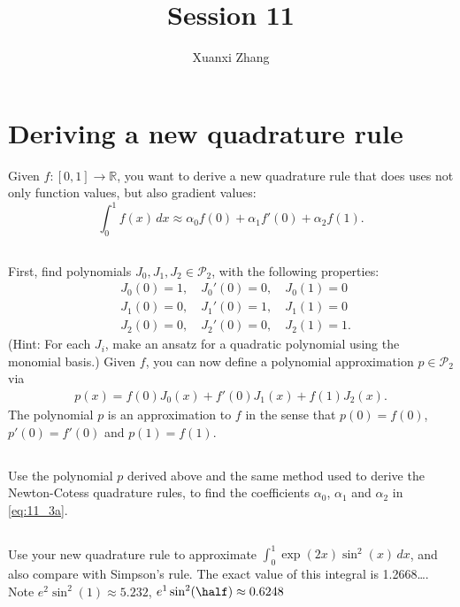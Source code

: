 \documentclass{article}%
\title{\huge Session 11\\
\normalsize}
\author{Xuanxi Zhang}
\begin{document}
\maketitle

\section{Deriving a new quadrature rule}
Given $f:[0,1]\rightarrow \mathbb{R}$, you want to derive a new
  quadrature rule that does uses not only function values, but also
  gradient values:
\begin{equation}
    \int_0^1 f(x)\,d x \approx \alpha_0 f(0) + \alpha_1 f'(0) + \alpha_2 f(1). \label{eq:11_3a}
\end{equation}
  
\subsection{}
First, find polynomials $J_0, J_1, J_2 \in \mathcal{P}_2$, with the
  following properties:
  \begin{align*}
    & J_0(0)=1,\quad J_0'(0)=0,\quad J_0(1)=0\\
    & J_1(0)=0,\quad J_1'(0)=1,\quad J_1(1)=0\\
    & J_2(0)=0,\quad J_2'(0)=0,\quad J_2(1)=1.
  \end{align*}
(Hint: For each $J_i$, make an ansatz for a quadratic polynomial using the monomial basis.)
Given $f$, you can now define a polynomial approximation $p\in \mathcal{P}_2$ via 
\begin{align}
    p(x)=f(0)J_0(x)+f'(0)J_1(x)+f(1)J_2(x). \label{eq:11_3b}
\end{align}
The polynomial $p$ is an approximation to $f$ in the sense that
$p(0)=f(0)$, $p'(0)=f'(0)$ and $p(1)=f(1)$. 

\subsection{}
Use the polynomial
  $p$ derived above and the same method used to derive the Newton-Cotess
  quadrature rules, to find the coefficients $\alpha_0$, $\alpha_1$ and
  $\alpha_2$ in \eqref{eq:11_3a}.
  
\subsection{}
Use your new quadrature rule to approximate
  $\int_0^1\exp(2x)\sin^2(x)\,dx$, and also compare with
  Simpson's rule. The exact value of this integral is 1.2668\dots. Note $e^2\sin^2(1)\approx 5.232$, $e^1\sin^2(\half)\approx 0.6248$
\end{document}
